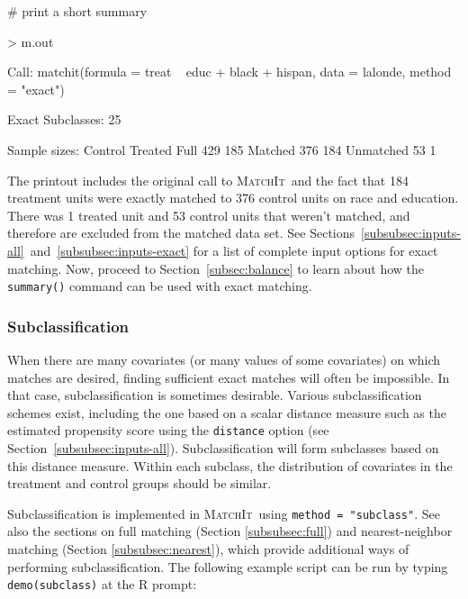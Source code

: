 \documentclass[oneside,letterpaper,titlepage]{article}
\newcommand{\MatchIt}{\textsc{MatchIt}}
\begin{document}
\# print a short summary
\begin{Schunk}
\begin{Sinput}
> m.out
\end{Sinput}
\begin{Soutput}
Call: matchit(formula = treat ~ educ + black + hispan, data = lalonde,     method = "exact")

Exact Subclasses: 25

Sample sizes:
          Control Treated
Full          429     185
Matched       376     184
Unmatched      53       1
\end{Soutput}
\end{Schunk}

The printout includes the original call to \MatchIt\ and the fact that
184
treatment units were exactly matched to 376 
control units on race
and education. There was 1
treated unit and 53
control units that weren't matched,
and therefore are excluded from the matched data set. See
Sections~\ref{subsubsec:inputs-all}~and~\ref{subsubsec:inputs-exact}
for a list of complete input options for exact matching.  Now, proceed
to Section~\ref{subsec:balance} to learn about how the {\tt summary()}
command can be used with exact matching.

\subsubsection{Subclassification}
\label{subsubsec:subclass}

When there are many covariates (or many values of some covariates) on
which matches are desired, finding sufficient exact matches will often
be impossible.  In that case, subclassification is sometimes
desirable. Various subclassification schemes exist, including the one
based on a scalar distance measure such as the estimated propensity
score using the \texttt{distance} option (see
Section~\ref{subsubsec:inputs-all}).  Subclassification will form
subclasses based on this distance measure.  Within each subclass, the
distribution of covariates in the treatment and control groups should
be similar.

Subclassification is implemented in \MatchIt\ using \texttt{method =
  "subclass"}.  See also the sections on full matching (Section
\ref{subsubsec:full}) and nearest-neighbor matching (Section
\ref{subsubsec:nearest}), which provide additional ways of performing
subclassification.  The following example script can be run by typing
{\tt demo(subclass)} at the R prompt:
\end{document}
